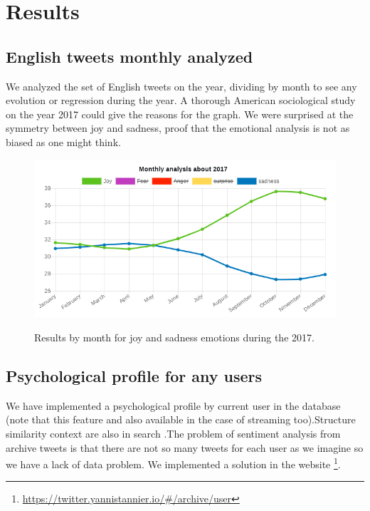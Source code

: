 \documentclass{acmtog} %
\begin{document}
\section{Results}
\label{sub:results}

\subsection{English tweets monthly analyzed}
\label{subsub:english_tweets_monthly}

We analyzed the set of English tweets on the year, dividing by month to see any evolution or regression during the year. A thorough American sociological study on the year 2017 could give the reasons for the graph. We were surprised at the symmetry between joy and sadness, proof that the emotional analysis is not as biased as one might think. 

\begin{figure}[H]
{\includegraphics[width=\linewidth]{monthly_analysis_joy_sadness-exemple.png}}
\caption{Results by month for joy and sadness emotions during the 2017.}
  \label{fig:trump_results}
\end{figure}

\subsection{Psychological profile for any users}
\label{subsub:psychological_profile}

We have implemented a psychological profile by current user in the database (note that this feature and also available in the case of streaming too).Structure similarity context are also in search \cite{Zou18}.The problem of sentiment analysis from archive tweets is that there are not so many tweets for each user as we imagine so we have a lack of data problem.
We implemented a solution in the website \footnote{\url{https://twitter.yannistannier.io/#/archive/user}}.
\end{document}
